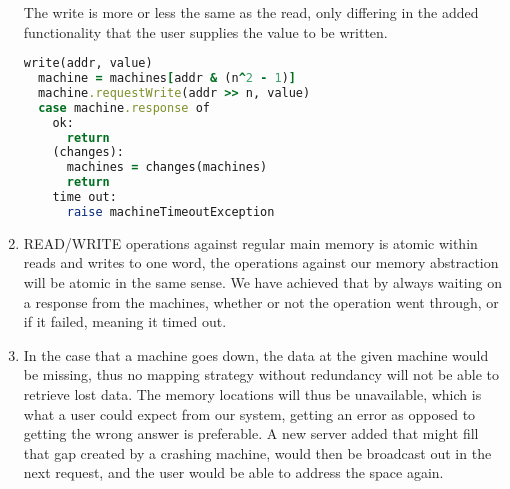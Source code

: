 \documentclass[a4paper]{article}
\begin{document}
\begin{enumerate}
\begin{lstlisting}[language=Ruby, caption={READ}]
    \end{lstlisting}
    The write is more or less the same as the read, only differing in the added functionality that the user supplies the value to be written.
    \begin{lstlisting}[language=Ruby, caption={WRITE}]
write(addr, value)
  machine = machines[addr & (n^2 - 1)]
  machine.requestWrite(addr >> n, value)
  case machine.response of
    ok:
      return
    (changes):
      machines = changes(machines)
      return
    time out:
      raise machineTimeoutException
    \end{lstlisting}
  \item
    READ/WRITE operations against regular main memory is atomic within reads and writes to one word, the operations against our memory abstraction will be atomic in the same sense. We have achieved that by always waiting on a response from the machines, whether or not the operation went through, or if it failed, meaning it timed out.
  \item
    In the case that a machine goes down, the data at the given machine would be missing, thus no mapping strategy without redundancy will not be able to retrieve lost data. The memory locations will thus be unavailable, which is what a user could expect from our system, getting an error as opposed to getting the wrong answer is preferable. A new server added that might fill that gap created by a crashing machine, would then be broadcast out in the next request, and the user would be able to address the space again.
\end{enumerate}
\end{document}
